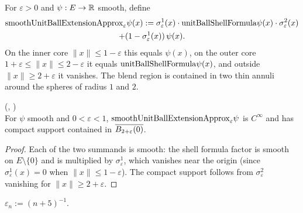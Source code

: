 \begin{definition}
\label{def:SmoothApproximationInternal_smoothUnitBallExtensionApprox}
\leanok
{}
For $\varepsilon > 0$ and $\psi : E \to \mathbb{R}$ smooth, define
\begin{multline*}
\mathrm{smoothUnitBallExtensionApprox}_\varepsilon \psi (x)
:= \sigma^1_\varepsilon(x) \cdot \mathrm{unitBallShellFormula} \psi(x) \cdot \sigma^2_\varepsilon(x) \\
+ (1 - \sigma^1_\varepsilon(x))\, \psi(x).
\end{multline*}
On the inner core $\|x\| \le 1 - \varepsilon$ this equals $\psi(x)$, on the
outer core $1 + \varepsilon \le \|x\| \le 2 - \varepsilon$ it equals
$\mathrm{unitBallShellFormula} \psi(x)$, and outside $\|x\| \ge 2 + \varepsilon$ it
vanishes. The blend region is contained in two thin annuli around the
spheres of radius $1$ and $2$.
\end{definition}

\begin{lemma}
\label{lem:SmoothApproximationInternal_smoothUnitBallExtensionApprox_co}
\leanok
{}
(,
)\\
For $\psi$ smooth and $0 < \varepsilon < 1$, $\mathrm{smoothUnitBallExtensionApprox}_\varepsilon
\psi$ is $C^\infty$ and has compact support contained in
$\overline{B_{2+\varepsilon}(0)}$.
\end{lemma}

\begin{proof}
\leanok
{}

Each of the two summands is smooth: the shell formula factor is smooth on
$E \setminus\{0\}$ and is multiplied by $\sigma^1_\varepsilon$, which
vanishes near the origin (since $\sigma^1_\varepsilon(x) = 0$ when
$\|x\| \le 1-\varepsilon$). The compact support follows from
$\sigma^2_\varepsilon$ vanishing for $\|x\| \ge 2+\varepsilon$.
\end{proof}

\begin{definition}
\label{def:SmoothApproximationInternal_unitBallApproxEps}
\leanok
$\varepsilon_n := (n+5)^{-1}$.
\end{definition}

